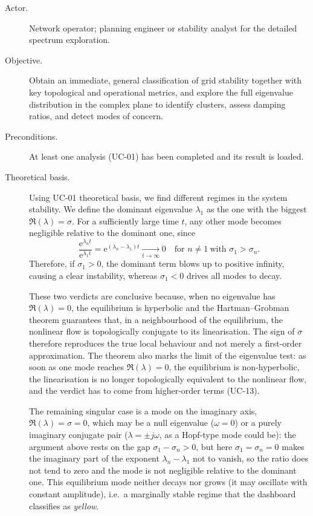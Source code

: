 \begin{description}
  \item[Actor.] Network operator; planning engineer or stability analyst for the detailed spectrum exploration.
  \item[Objective.] Obtain an immediate, general classification of grid stability together with key topological and operational metrics, and explore the full eigenvalue distribution in the complex plane to identify clusters, assess damping ratios, and detect modes of concern.
  \item[Preconditions.] At least one analysis (UC-01) has been completed and its result is loaded.
  \item[Theoretical basis.] Using UC-01 theoretical basis, we find different regimes in the system stability. We define the dominant eigenvalue $\lambda_1$ as the one with the biggest $\Re(\lambda)=\sigma$. For a sufficiently large time $t$, any other mode becomes negligible relative to the dominant one, since
        \[
          \frac{\mathrm{e}^{\lambda_n t}}{\mathrm{e}^{\lambda_1 t}}
          = \mathrm{e}^{(\lambda_n-\lambda_1)t} \xrightarrow[t\to\infty]{} 0 \quad \text{for } n\neq 1 \ \text{with } \sigma_1>\sigma_n .
        \]
        Therefore, if $\sigma_1>0$, the dominant term blows up to positive infinity, causing a clear instability, whereas $\sigma_1<0$ drives all modes to decay.

        These two verdicts are conclusive because, when no eigenvalue has $\Re(\lambda)=0$, the equilibrium is hyperbolic and the Hartman--Grobman theorem guarantees that, in a neighbourhood of the equilibrium, the nonlinear flow is topologically conjugate to its linearisation. The sign of $\sigma$ therefore reproduces the true local behaviour and not merely a first-order approximation. The theorem also marks the limit of the eigenvalue test: as soon as one mode reaches $\Re(\lambda)=0$, the equilibrium is non-hyperbolic, the linearisation is no longer topologically equivalent to the nonlinear flow, and the verdict has to come from higher-order terms (UC-13).

        The remaining singular case is a mode on the imaginary axis, $\Re(\lambda)=\sigma=0$, which may be a null eigenvalue ($\omega=0$) or a purely imaginary conjugate pair ($\lambda=\pm j\omega$, as a Hopf-type mode could be): the argument above rests on the gap $\sigma_1-\sigma_n>0$, but here $\sigma_1=\sigma_n=0$ makes the imaginary part of the exponent $\lambda_n-\lambda_1$ not to vanish, so the ratio does not tend to zero and the mode is not negligible relative to the dominant one. This equilibrium mode neither decays nor grows (it may oscillate with constant amplitude), i.e.\ a marginally stable regime that the dashboard classifies as \emph{yellow}.


\end{description}
